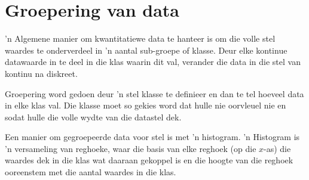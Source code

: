 \section{Groepering van data}
\label{sec:statistics_grouping_data}
'n Algemene manier om kwantitatiewe data te hanteer is om die volle stel waardes te onderverdeel in ’n aantal sub-groepe of klasse. Deur elke kontinue datawaarde in te deel in die klas waarin dit val, verander die data in die stel van kontinu na diskreet.\par

Groepering word gedoen deur ’n stel klasse te definieer en dan te tel hoeveel data in elke klas val. Die klasse moet so gekies word dat hulle nie oorvleuel nie en sodat hulle die volle wydte van die datastel dek.\par

Een manier om gegroepeerde data voor stel is met ’n histogram. ’n Histogram is ’n versameling van reghoeke, waar die basis van elke reghoek (op die $x$-as) die waardes dek in die klas wat daaraan gekoppel is en die hoogte van die reghoek ooreenstem met die aantal waardes in die klas. 
\par
{}

